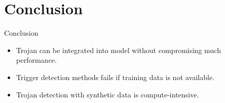 \section{Conclusion}
\begin{frame}{Conclusion}
\justifying

\begin{itemize}
    \item Trojan can be integrated into model without compromising much performance.
    \item Trigger detection methods fails if training data is not available.
    \item Trojan detection with synthetic data is compute-intensive.
\end{itemize}

\end{frame}